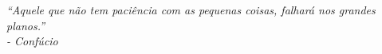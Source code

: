 \begin{epigrafe}
    \vspace*{\fill}
	\begin{flushright}
		\textit{``Aquele que não tem paciência com as pequenas coisas, falhará nos grandes planos.'' \\
		- Confúcio}
	\end{flushright}
\end{epigrafe}
